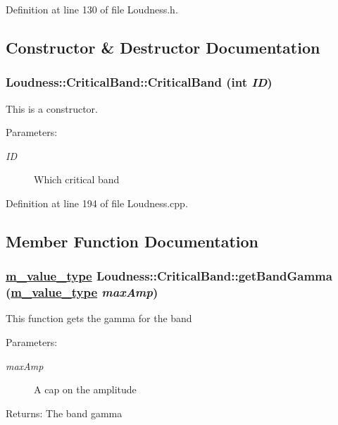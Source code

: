 Definition at line 130 of file Loudness.h.

\subsection{Constructor \& Destructor Documentation}
\hypertarget{classLoudness_1_1CriticalBand_a0}{
\subsubsection[CriticalBand]{\setlength{\rightskip}{0pt plus 5cm}Loudness::Critical\-Band::Critical\-Band (int {\em ID})}}
\label{classLoudness_1_1CriticalBand_a0}


This is a constructor. \begin{Desc}
\item[Parameters:]
\begin{description}
\item[{\em ID}]Which critical band \end{description}
\end{Desc}


Definition at line 194 of file Loudness.cpp.

\subsection{Member Function Documentation}
\hypertarget{classLoudness_1_1CriticalBand_a1}{
\subsubsection[getBandGamma]{\setlength{\rightskip}{0pt plus 5cm}\hyperlink{Types_8h_a3}{m\_\-value\_\-type} Loudness::Critical\-Band::get\-Band\-Gamma (\hyperlink{Types_8h_a3}{m\_\-value\_\-type} {\em max\-Amp})}}
\label{classLoudness_1_1CriticalBand_a1}


This function gets the gamma for the band \begin{Desc}
\item[Parameters:]
\begin{description}
\item[{\em max\-Amp}]A cap on the amplitude \end{description}
\end{Desc}
\begin{Desc}
\item[Returns:]The band gamma \end{Desc}



